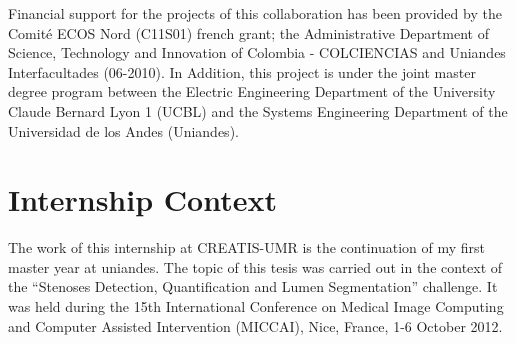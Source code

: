 Financial support for the projects of this collaboration has been provided by the Comit{\'e} ECOS Nord (C11S01) french grant; the Administrative Department of Science, Technology and Innovation of Colombia - COLCIENCIAS and Uniandes Interfacultades (06-2010). In Addition, this project is under the joint master degree program between the Electric Engineering Department of the University Claude Bernard Lyon 1 (UCBL) and the Systems Engineering Department of the Universidad de los Andes (Uniandes). 

\section{Internship Context}
The work of this internship at CREATIS-UMR is the continuation of my first master year at uniandes. The topic of this tesis was carried out in the context of the ``Stenoses Detection, Quantification and Lumen Segmentation'' challenge. It was held during the 15th International Conference on Medical Image Computing and Computer Assisted Intervention (MICCAI), Nice, France, 1-6 October 2012.
